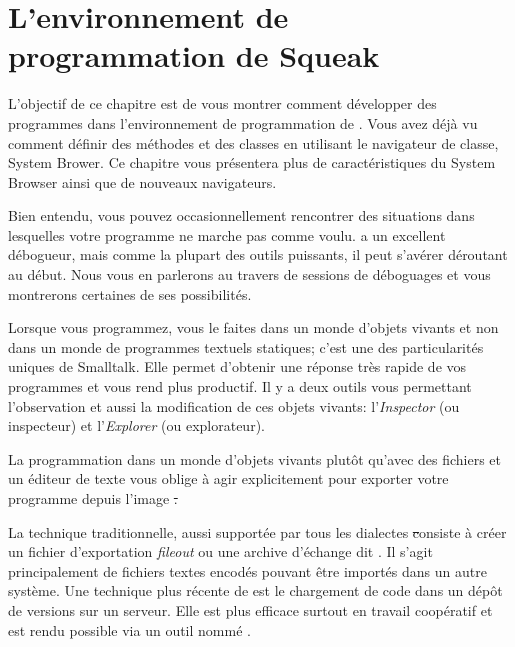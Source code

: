 \documentclass[a4paper,10pt,twoside]{book}
\begin{document}
	\renewcommand{\nnbb}[2]{} %
	\sloppy
\fi

\chapter{L'environnement de programmation de Squeak}
\label{cha:env}

L'objectif de ce chapitre est de vous montrer comment d\'evelopper des programmes dans l'environnement de programmation de \sq.
Vous avez d\'ej\`a vu comment d\'efinir des m\'ethodes et des classes
en utilisant le navigateur de classe, System Brower. Ce chapitre
vous pr\'esentera plus de caract\'eristiques du System Browser ainsi que
de nouveaux navigateurs.

Bien entendu, vous pouvez occasionnellement rencontrer
des situations dans lesquelles votre programme ne marche pas comme voulu.
\sq a un excellent d\'ebogueur, mais comme la plupart des outils puissants, il peut s'av\'erer d\'eroutant au d\'ebut.
Nous vous en parlerons au travers de sessions de d\'eboguages et vous
montrerons certaines de ses possibilit\'es.

Lorsque vous programmez, vous le faites dans un monde d'objets vivants et
non dans un monde de programmes textuels statiques; c'est 
une des particularit\'es uniques de Smalltalk.
Elle permet d'obtenir une r\'eponse tr\`es rapide de vos programmes et vous rend plus productif. Il y a deux outils vous permettant l'observation et aussi la modification de ces objets vivants: l'\emph{Inspector} (ou inspecteur) et l'\emph{Explorer} (ou explorateur).

La programmation dans un monde d'objets vivants plut\^ot qu'avec des fichiers et un \'editeur de texte vous oblige \`a agir explicitement pour exporter votre programme depuis l'image \st.

La technique traditionnelle, aussi support\'ee par tous les dialectes \st consiste \`a cr\'eer un fichier d'exportation \emph{fileout} ou une archive d'\'echange dit \changeset. Il s'agit principalement de fichiers textes encod\'es pouvant \^etre import\'es dans un autre syst\`eme.
Une technique plus r\'ecente de \sq est le chargement de code dans un d\'ep\^ot de versions sur un serveur.
Elle est plus efficace surtout en travail coop\'eratif et est rendu possible via un outil nomm\'e .
\end{document}
